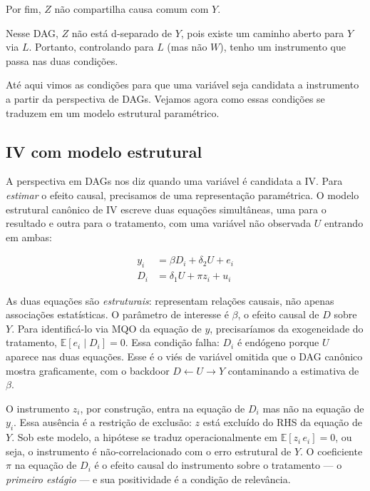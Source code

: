 \documentclass[
]{article}
\begin{document}
Por fim, \(Z\) não compartilha causa comum com \(Y\).

Nesse DAG, \(Z\) não está d-separado de \(Y\), pois existe um caminho aberto para \(Y\) via \(L\). Portanto, controlando para \(L\) (mas não \(W\)), tenho um instrumento que passa nas duas condições.

Até aqui vimos as condições para que uma variável seja candidata a instrumento a partir da perspectiva de DAGs. Vejamos agora como essas condições se traduzem em um modelo estrutural paramétrico.

\subsection{IV com modelo estrutural}\label{iv-com-modelo-estrutural}

A perspectiva em DAGs nos diz quando uma variável é candidata a IV. Para \emph{estimar} o efeito causal, precisamos de uma representação paramétrica. O modelo estrutural canônico de IV escreve duas equações simultâneas, uma para o resultado e outra para o tratamento, com uma variável não observada \(U\) entrando em ambas:

\begin{equation}
\begin{aligned}
y_i &= \beta D_i + \delta_2 U + e_i \\
D_i &= \delta_1 U + \pi z_i + u_i
\end{aligned}
\label{eq:estrutural}
\end{equation}

As duas equações são \emph{estruturais}: representam relações causais, não apenas associações estatísticas. O parâmetro de interesse é \(\beta\), o efeito causal de \(D\) sobre \(Y\). Para identificá-lo via MQO da equação de \(y\), precisaríamos da exogeneidade do tratamento, \(\mathbb{E}[e_i \mid D_i] = 0\). Essa condição falha: \(D_i\) é endógeno porque \(U\) aparece nas duas equações. Esse é o viés de variável omitida que o DAG canônico mostra graficamente, com o backdoor \(D \leftarrow U \to Y\) contaminando a estimativa de \(\beta\).

O instrumento \(z_i\), por construção, entra na equação de \(D_i\) mas não na equação de \(y_i\). Essa ausência é a restrição de exclusão: \(z\) está excluído do RHS da equação de \(Y\). Sob este modelo, a hipótese se traduz operacionalmente em \(\mathbb{E}[z_i \, e_i] = 0\), ou seja, o instrumento é não-correlacionado com o erro estrutural de \(Y\). O coeficiente \(\pi\) na equação de \(D_i\) é o efeito causal do instrumento sobre o tratamento --- o \emph{primeiro estágio} --- e sua positividade é a condição de relevância.
\end{document}

